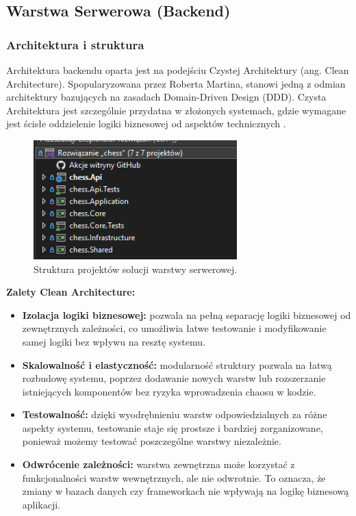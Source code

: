 \documentclass[twoside]{projektInzynierskiMS1}
\begin{document}
\newpage

\subsection{Warstwa Serwerowa (Backend)} 

\subsubsection{Architektura i struktura} 

\noindent
Architektura backendu oparta jest na podejściu Czystej Architektury (ang. Clean Architecture). Spopularyzowana przez Roberta Martina,  stanowi jedną z odmian architektury bazujących na zasadach Domain-Driven Design (DDD). Czysta Architektura jest szczególnie przydatna w złożonych systemach, gdzie wymagane jest ścisłe oddzielenie logiki biznesowej od aspektów technicznych \cite{DotNetKsiazka}.

\vspace{0.5cm}
\begin{figure}[h!] 
    \centering 
    \includegraphics[width=0.7\textwidth]{images/struktura_back.png} 
    \caption{Struktura projektów solucji warstwy serwerowej.} 
\end{figure}
\vspace{0.5cm}

\noindent \textbf{Zalety Clean Architecture:} 
\begin{itemize}
    \item \textbf{Izolacja logiki biznesowej:} pozwala na pełną separację logiki biznesowej od zewnętrznych zależności, co umożliwia łatwe testowanie i modyfikowanie samej logiki bez wpływu na resztę systemu.
    \item \textbf{Skalowalność i elastyczność:} modularność struktury pozwala na łatwą rozbudowę systemu, poprzez dodawanie nowych warstw lub rozszerzanie istniejących komponentów bez ryzyka wprowadzenia chaosu w kodzie.
    \item \textbf{Testowalność:} dzięki wyodrębnieniu warstw odpowiedzialnych za różne aspekty systemu, testowanie staje się prostsze i bardziej zorganizowane, ponieważ możemy testować poszczególne warstwy niezależnie.
    \item \textbf{Odwrócenie zależności:} warstwa zewnętrzna może korzystać z funkcjonalności warstw wewnętrznych, ale nie odwrotnie. To oznacza, że zmiany w bazach danych czy frameworkach nie wpływają na logikę biznesową aplikacji.
\end{itemize}
\end{document}
